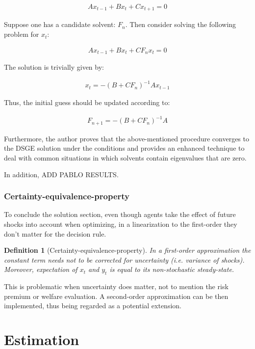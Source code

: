 \documentclass{pracamgr}
\numberwithin{equation}{section}
\newtheorem{mydef}{Definition}
\begin{document}
\begin{align}
Ax_{t-1} + Bx_{t} + Cx_{t+1}  = 0
\end{align}

Suppose one has a candidate solvent: $F_{n}$. Then consider solving the following problem for $x_{t}$:

\begin{align}
Ax_{t-1} + Bx_{t} + CF_{n}x_{t}  = 0
\end{align}

The solution is trivially given by:

\begin{align}
x_{t} = -\left( B + CF_{n} \right)^{-1} Ax_{t-1}
\end{align}

Thus, the initial guess should be updated according to:

\begin{align}
F_{n+1} = -\left( B + CF_{n} \right)^{-1} A
\end{align}

Furthermore, the author proves that the above-mentioned procedure converges to the DSGE solution under the \citet{blanchard1980solution} conditions and provides an enhanced technique to deal with common situations in which solvents contain eigenvalues that are zero.

In addition, {\color{red} ADD PABLO RESULTS}.

\subsection{Certainty-equivalence-property}

To conclude the solution section, even though agents take the effect of future shocks into account when optimizing, in a linearization to the first-order they don't matter for the decision rule.

\begin{mydef}[Certainty-equivalence-property]
In a first-order approximation the constant term needs not to be corrected for uncertainty (i.e. variance of shocks). Moreover, expectation of $x_t$ and $y_t$ is equal to its non-stochastic steady-state.
\end{mydef}

This is problematic when uncertainty does matter, not to mention the risk premium or welfare evaluation. A second-order approximation can be then implemented, thus being regarded as a potential extension.

\chapter{Estimation}
\end{document}

